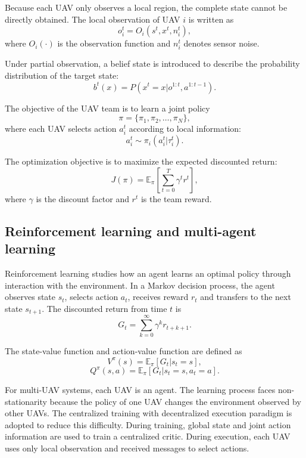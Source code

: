 \documentclass[14pt,a4paper]{extarticle}
\begin{document}
Because each UAV only observes a local region, the complete state cannot be directly obtained. The local observation of UAV $i$ is written as
\[
o_i^t=O_i(s^t,x^t,n_i^t),
\]
where $O_i(\cdot)$ is the observation function and $n_i^t$ denotes sensor noise.

Under partial observation, a belief state is introduced to describe the probability distribution of the target state:
\begin{equation}
  b^t(x)=P(x^t=x|o^{1:t},a^{1:t-1}).
\end{equation}

The objective of the UAV team is to learn a joint policy
\[
\pi=\{\pi_1,\pi_2,\ldots,\pi_N\},
\]
where each UAV selects action $a_i^t$ according to local information:
\[
a_i^t \sim \pi_i(a_i^t|\tau_i^t).
\]

The optimization objective is to maximize the expected discounted return:
\begin{equation}
  J(\pi)=\mathbb{E}_{\pi}\left[\sum_{t=0}^{T}\gamma^t r^t\right],
\end{equation}
where $\gamma$ is the discount factor and $r^t$ is the team reward.

\subsection{Reinforcement learning and multi-agent learning}

Reinforcement learning studies how an agent learns an optimal policy through interaction with the environment. In a Markov decision process, the agent observes state $s_t$, selects action $a_t$, receives reward $r_t$ and transfers to the next state $s_{t+1}$. The discounted return from time $t$ is
\begin{equation}
  G_t=\sum_{k=0}^{\infty}\gamma^k r_{t+k+1}.
\end{equation}

The state-value function and action-value function are defined as
\begin{equation}
  V^{\pi}(s)=\mathbb{E}_{\pi}[G_t|s_t=s],
\end{equation}
\begin{equation}
  Q^{\pi}(s,a)=\mathbb{E}_{\pi}[G_t|s_t=s,a_t=a].
\end{equation}

For multi-UAV systems, each UAV is an agent. The learning process faces non-stationarity because the policy of one UAV changes the environment observed by other UAVs. The centralized training with decentralized execution paradigm is adopted to reduce this difficulty. During training, global state and joint action information are used to train a centralized critic. During execution, each UAV uses only local observation and received messages to select actions.
\end{document}
